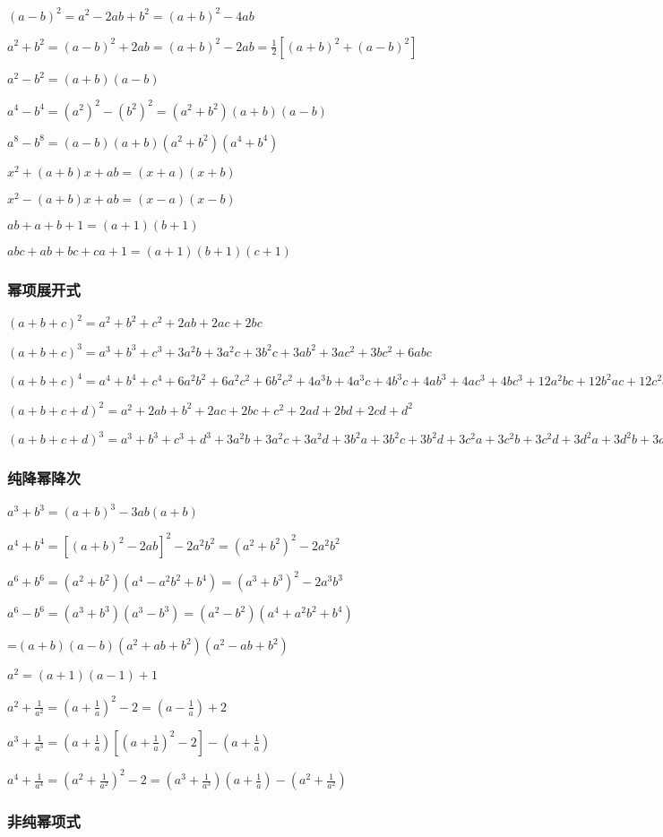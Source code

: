 \documentclass[UTF8]{ctexart}
\begin{document}
$\left(a-b\right)^2=a^2-2ab+b^2=(a+b)^2-4ab$

${a^2+b^2}=(a-b)^2+2ab=(a+b)^2-2ab=\frac{1}{2}[(a+b)^2+(a-b)^2]$

$a^2-b^2=\left(a+b\right)\left(a-b\right)$

$a^4-b^4=(a^2)^2-(b^2)^2=(a^2+b^2)(a+b)(a-b)$

$a^8-b^8=(a-b)(a+b)(a^2+b^2)(a^4+b^4)$

$x^2+(a+b)x+ab=(x+a)(x+b)$

$x^2-(a+b)x+ab=(x-a)(x-b)$

$ab+a+b+1=(a+1)(b+1)$

$abc+ab+bc+ca+1=(a+1)(b+1)(c+1)$

\subsubsection{幂项展开式}

$ (a+b+c)^2=a^2+b^2+c^2+2ab+2ac+2bc$

$ (a+b+c)^3=a^3+b^3+c^3+3a^2b+3a^2c+3b^2c+3ab^2+3ac^2+3bc^2+6abc$

$
(a+b+c)^4=a^4+b^4+c^4+6a^2b^2+6a^2c^2+6b^2c^2+4a^3b+4a^3c+4b^3c+4ab^3+4ac^3+4bc^3+12a^2bc+12b^2ac+12c^2ab$

$(a+b+c+d)^2=a^2+2ab+b^2+2ac+2bc+c^2+2ad+2bd+2cd+d^2$

$
(a+b+c+d)^3=a^3+b^3+c^3+d^3+3a^2b+3a^2c+3a^2d+3b^2a+3b^2c+3b^2d+3c^2a+3c^2b+3c^2d+3d^2a+3d^2b+3d^2c+6abc+6abd+6acd+6bcd$

\subsubsection{纯降幂降次}

$a^3+b^3=(a+b)^3-3ab(a+b)$

$a^4+b^4=[(a+b)^2-2ab]^2-2a^2b^2=(a^2+b^2)^2-2a^2b^2 $

$a^6+b^6=(a^2+b^2)(a^4-a^2b^2+b^4)=(a^3+b^3)^2-2a^3b^3 $

$a^6-b^6=(a^3+b^3)(a^3-b^3)=(a^2-b^2)(a^4+a^2b^2+b^4) $

=$(a+b)(a-b)(a^2+ab+b^2)(a^2-ab+b^2)$

$a^2=(a+1)(a-1)+1$

$a^2+\frac{1}{a^2}=(a+\frac{1}{a})^2-2=(a-\frac{1}{a})+2$

$a^3+\frac{1}{a^3}=(a+\frac{1}{a})[(a+\frac{1}{a} )^2-2]-(a+\frac{1}{a})$

$a^4+\frac{1}{a^4}=(a^2+\frac{1}{a^2})^2-2=(a^3+\frac{1}{a^3})(a+\frac{1}{a})-(a^2+\frac{1}{a^2})$
\subsubsection{非纯幂项式}
\end{document}
